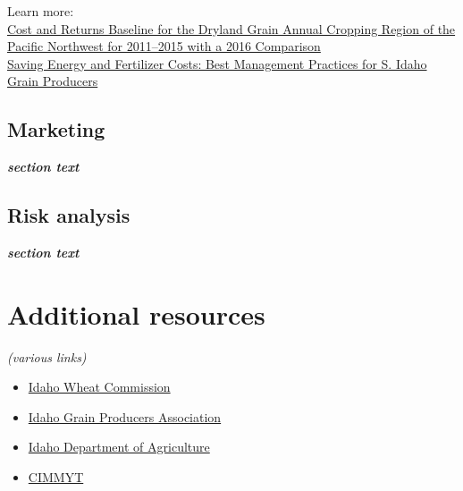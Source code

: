 \documentclass[
  letterpaper,
  DIV=11,
  numbers=noendperiod]{scrreprt}
\providecommand{\tightlist}{%
  \setlength{\itemsep}{0pt}\setlength{\parskip}{0pt}}\usepackage{longtable,booktabs,array}
\begin{document}
Learn more:\\
\href{https://www.uidaho.edu/extension/publications/publication-detail?id=pnw0701}{Cost
and Returns Baseline for the Dryland Grain Annual Cropping Region of the
Pacific Northwest for 2011--2015 with a 2016 Comparison}\\
\href{https://www.uidaho.edu/-/media/UIdaho-Responsive/Files/Extension/publications/cis/cis1127.pdf}{Saving
Energy and Fertilizer Costs: Best Management Practices for S. Idaho
Grain Producers}

\section{Marketing}\label{marketing}

\textbf{\emph{section text}}

\section{Risk analysis}\label{risk-analysis}

\textbf{\emph{section text}}


\chapter{Additional resources}\label{additional-resources}

\emph{(various links)}

\begin{itemize}
\tightlist
\item
  \href{https://www.idahowheat.org/}{Idaho Wheat Commission}
\item
  \href{https://www.idahograin.org/}{Idaho Grain Producers Association}
\item
  \href{https://agri.idaho.gov/}{Idaho Department of Agriculture}
\item
  \href{https://www.cimmyt.org/work/wheat-research/}{CIMMYT}
\end{itemize}
\end{document}
